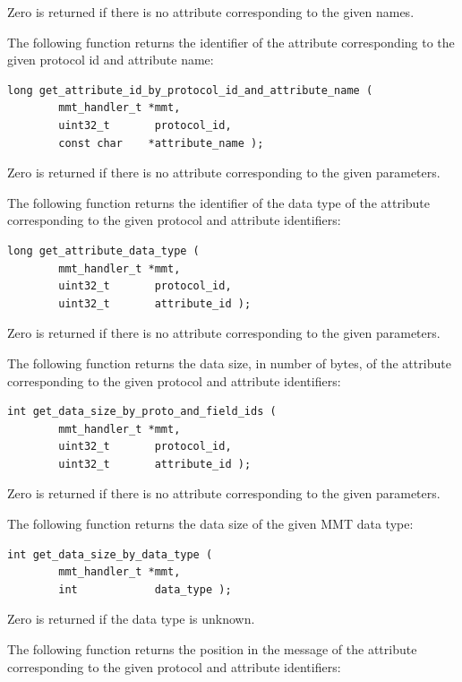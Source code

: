 Zero is returned if there is no attribute corresponding to the given names. 


The following function returns the identifier of the attribute corresponding to the given protocol id and attribute name:

\begin{lstlisting}[style=Cpp]
long get_attribute_id_by_protocol_id_and_attribute_name (
        mmt_handler_t *mmt,
        uint32_t       protocol_id,
        const char    *attribute_name );
\end{lstlisting}

Zero is returned if there is no attribute corresponding to the given parameters. 


The following function returns the identifier of the data type of the attribute corresponding to the given protocol and attribute identifiers:

\begin{lstlisting}[style=Cpp]
long get_attribute_data_type (
        mmt_handler_t *mmt,
        uint32_t       protocol_id,
        uint32_t       attribute_id );
\end{lstlisting}

Zero is returned if there is no attribute corresponding to the given parameters. 


The following function returns the data size, in number of bytes, of the attribute corresponding to the given protocol and attribute identifiers:

\begin{lstlisting}[style=Cpp]
int get_data_size_by_proto_and_field_ids (
        mmt_handler_t *mmt, 
        uint32_t       protocol_id, 
        uint32_t       attribute_id );
\end{lstlisting} 

Zero is returned if there is no attribute corresponding to the given parameters. 


The following function returns the data size of the given MMT data type:

\begin{lstlisting}[style=Cpp]
int get_data_size_by_data_type (
        mmt_handler_t *mmt,
        int            data_type );
\end{lstlisting}

Zero is returned if the data type is unknown.


The following function returns the position in the message of the attribute corresponding to the given protocol and attribute identifiers:

